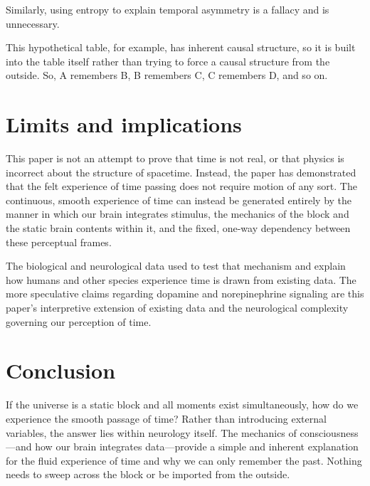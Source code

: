 \documentclass[11pt,a4paper]{article}
\begin{document}
Similarly, using entropy to explain temporal asymmetry is a fallacy and is unnecessary.

This hypothetical table, for example, has inherent causal structure, so it is built into the table itself rather than trying to force a causal structure from the outside. So, A remembers B, B remembers C, C remembers D, and so on.

\section{Limits and implications}

This paper is not an attempt to prove that time is not real, or that physics is incorrect about the structure of spacetime. Instead, the paper has demonstrated that the felt experience of time passing does not require motion of any sort. The continuous, smooth experience of time can instead be generated entirely by the manner in which our brain integrates stimulus, the mechanics of the block and the static brain contents within it, and the fixed, one-way dependency between these perceptual frames.

The biological and neurological data used to test that mechanism and explain how humans and other species experience time is drawn from existing data. The more speculative claims regarding dopamine and norepinephrine signaling are this paper’s interpretive extension of existing data and the neurological complexity governing our perception of time.

\section{Conclusion}

If the universe is a static block and all moments exist simultaneously, how do we experience the smooth passage of time? Rather than introducing external variables, the answer lies within neurology itself. The mechanics of consciousness—and how our brain integrates data—provide a simple and inherent explanation for the fluid experience of time and why we can only remember the past. Nothing needs to sweep across the block or be imported from the outside.



\end{document}
